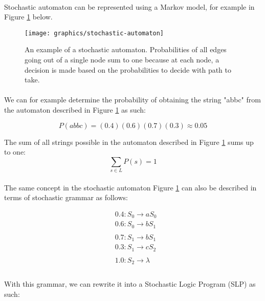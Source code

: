 \documentclass{article}
\theoremstyle{plain}
\theoremstyle{definition}
\begin{document}
\begin{multicols}{2}
\paragraph{} Stochastic automaton can be represented using a Markov model, for example in Figure \ref{fig:StochasticAutomaton} below.

\begin{figure}[H]
\texttt{[image: graphics/stochastic-automaton]}
\caption{An example of a stochastic automaton. Probabilities of all edges going out of a single node sum to one because at each node, a decision is made based on the probabilities to decide with path to take.}\label{fig:StochasticAutomaton}
\end{figure}

\paragraph{} We can for example determine the probability of obtaining the string "abbc" from the automaton described in Figure \ref{fig:StochasticAutomaton} as such: 

$$P(abbc) = (0.4)(0.6)(0.7)(0.3) \approx 0.05$$

\noindent The sum of all strings possible in the automaton described in Figure \ref{fig:StochasticAutomaton} sums up to one: $$\sum_{s \in L} P(s) = 1$$

\paragraph{} The same concept in the stochastic automaton Figure \ref{fig:StochasticAutomaton} can also be described in terms of stochastic grammar as follows:

\begin{align*}
&0.4: S_0 \rightarrow aS_0\\
&0.6: S_0 \rightarrow bS_1\\
\\
&0.7: S_1 \rightarrow bS_1\\
&0.3: S_1 \rightarrow cS_2\\
\\
&1.0: S_2 \rightarrow \lambda\\
\end{align*}

\paragraph{} With this grammar, we can rewrite it into a Stochastic Logic Program (SLP) as such:


\end{multicols}
\end{document}
